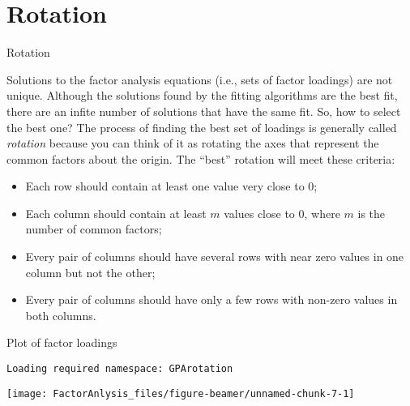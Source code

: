 \documentclass[10pt,ignorenonframetext,]{beamer}
\providecommand{\tightlist}{%
  \setlength{\itemsep}{0pt}\setlength{\parskip}{0pt}}
\begin{document}
\section{Rotation}\label{rotation}

\begin{frame}{Rotation}

Solutions to the factor analysis equations (i.e., sets of factor
loadings) are not unique. Although the solutions found by the fitting
algorithms are the best fit, there are an infite number of solutions
that have the same fit. So, how to select the best one? The process of
finding the best set of loadings is generally called \emph{rotation}
because you can think of it as rotating the axes that represent the
common factors about the origin. The ``best'' rotation will meet these
criteria:

\begin{itemize}
\tightlist
\item
  Each row should contain at least one value very close to 0;
\item
  Each column should contain at least \(m\) values close to 0, where
  \(m\) is the number of common factors;
\item
  Every pair of columns should have several rows with near zero values
  in one column but not the other;
\item
  Every pair of columns should have only a few rows with non-zero values
  in both columns.
\end{itemize}

\end{frame}

\begin{frame}[fragile]{Plot of factor loadings}

\begin{verbatim}
Loading required namespace: GPArotation
\end{verbatim}

\texttt{[image: FactorAnlysis\_files/figure-beamer/unnamed-chunk-7-1]}

\end{frame}
\end{document}
